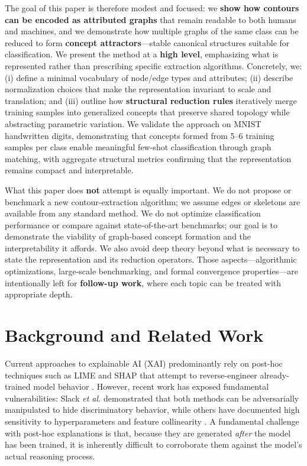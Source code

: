 \documentclass[runningheads]{llncs}
\begin{document}
The goal of this paper is therefore modest and focused: we \textbf{show how contours can be encoded as attributed graphs} that remain readable to both humans and machines, and we demonstrate how multiple graphs of the same class can be reduced to form \textbf{concept attractors}---stable canonical structures suitable for classification. We present the method at a \textbf{high level}, emphasizing what is represented rather than prescribing specific extraction algorithms. Concretely, we: (i) define a minimal vocabulary of node/edge types and attributes; (ii) describe normalization choices that make the representation invariant to scale and translation; and (iii) outline how \textbf{structural reduction rules} iteratively merge training samples into generalized concepts that preserve shared topology while abstracting parametric variation. We validate the approach on MNIST handwritten digits, demonstrating that concepts formed from 5--6 training samples per class enable meaningful few-shot classification through graph matching, with aggregate structural metrics confirming that the representation remains compact and interpretable.

What this paper does \textbf{not} attempt is equally important. We do not propose or benchmark a new contour-extraction algorithm; we assume edges or skeletons are available from any standard method. We do not optimize classification performance or compare against state-of-the-art benchmarks; our goal is to demonstrate the viability of graph-based concept formation and the interpretability it affords. We also avoid deep theory beyond what is necessary to state the representation and its reduction operators. Those aspects---algorithmic optimizations, large-scale benchmarking, and formal convergence properties---are intentionally left for \textbf{follow-up work}, where each topic can be treated with appropriate depth.

\section{Background and Related Work}

Current approaches to explainable AI (XAI) predominantly rely on post-hoc techniques such as LIME and SHAP that attempt to reverse-engineer already-trained model behavior \cite{ribeiro2016should,lundberg2017unified}. However, recent work has exposed fundamental vulnerabilities: Slack \emph{et al.} \cite{slack2020foolinglimeshapadversarial} demonstrated that both methods can be adversarially manipulated to hide discriminatory behavior, while others have documented high sensitivity to hyperparameters and feature collinearity \cite{hooshyar2024problems}. A fundamental challenge with post-hoc explanations is that, because they are generated \textit{after} the model has been trained, it is inherently difficult to corroborate them against the model's actual reasoning process.
\end{document}
